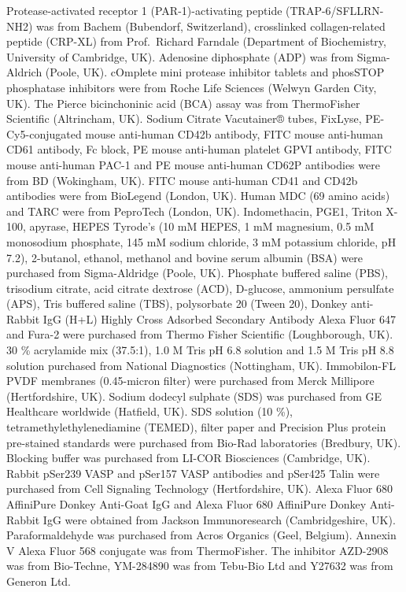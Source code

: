 \documentclass[11pt,twoside]{bristolthesis}
\begin{document}
Protease-activated receptor 1 (PAR-1)-activating peptide (TRAP-6/SFLLRN-NH2) was from Bachem (Bubendorf, Switzerland), crosslinked collagen-related peptide (CRP-XL) from Prof.~Richard Farndale (Department of Biochemistry, University of Cambridge, UK). Adenosine diphosphate (ADP) was from Sigma-Aldrich (Poole, UK). cOmplete mini protease inhibitor tablets and phosSTOP phosphatase inhibitors were from Roche Life Sciences (Welwyn Garden City, UK). The Pierce bicinchoninic acid (BCA) assay was from ThermoFisher Scientific (Altrincham, UK). Sodium Citrate Vacutainer® tubes, FixLyse, PE-Cy5-conjugated mouse anti-human CD42b antibody, FITC mouse anti-human CD61 antibody, Fc block, PE mouse anti-human platelet GPVI antibody, FITC mouse anti-human PAC-1 and PE mouse anti-human CD62P antibodies were from BD (Wokingham, UK). FITC mouse anti-human CD41 and CD42b antibodies were from BioLegend (London, UK). Human MDC (69 amino acids) and TARC were from PeproTech (London, UK). Indomethacin, PGE1, Triton X-100, apyrase, HEPES Tyrode's (10 mM HEPES, 1 mM magnesium, 0.5 mM monosodium phosphate, 145 mM sodium chloride, 3 mM potassium chloride, pH 7.2), 2-butanol, ethanol, methanol and bovine serum albumin (BSA) were purchased from Sigma-Aldridge (Poole, UK). Phosphate buffered saline (PBS), trisodium citrate, acid citrate dextrose (ACD), D-glucose, ammonium persulfate (APS), Tris buffered saline (TBS), polysorbate 20 (Tween 20), Donkey anti-Rabbit IgG (H+L) Highly Cross Adsorbed Secondary Antibody Alexa Fluor 647 and Fura-2 were purchased from Thermo Fisher Scientific (Loughborough, UK). 30 \% acrylamide mix (37.5:1), 1.0 M Tris pH 6.8 solution and 1.5 M Tris pH 8.8 solution purchased from National Diagnostics (Nottingham, UK). Immobilon-FL PVDF membranes (0.45-micron filter) were purchased from Merck Millipore (Hertfordshire, UK). Sodium dodecyl sulphate (SDS) was purchased from GE Healthcare worldwide (Hatfield, UK). SDS solution (10 \%), tetramethylethylenediamine (TEMED), filter paper and Precision Plus protein pre-stained standards were purchased from Bio-Rad laboratories (Bredbury, UK). Blocking buffer was purchased from LI-COR Biosciences (Cambridge, UK). Rabbit pSer239 VASP and pSer157 VASP antibodies and pSer425 Talin were purchased from Cell Signaling Technology (Hertfordshire, UK). Alexa Fluor 680 AffiniPure Donkey Anti-Goat IgG and Alexa Fluor 680 AffiniPure Donkey Anti-Rabbit IgG were obtained from Jackson Immunoresearch (Cambridgeshire, UK). Paraformaldehyde was purchased from Acros Organics (Geel, Belgium). Annexin V Alexa Fluor 568 conjugate was from ThermoFisher. The inhibitor AZD-2908 was from Bio-Techne, YM-284890 was from Tebu-Bio Ltd and Y27632 was from Generon Ltd.
\end{document}
